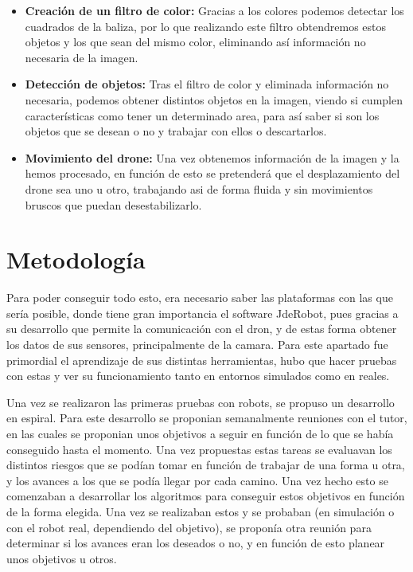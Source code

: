 \begin{itemize}
	\item \textbf{Creaci\'on de un filtro de color:} Gracias a los colores podemos detectar los cuadrados de la baliza, por lo que realizando este filtro obtendremos estos objetos y los que sean del mismo color, eliminando as\'i informaci\'on no necesaria de la imagen.
	
	\item \textbf{Detecci\'on de objetos: } Tras el filtro de color y eliminada informaci\'on no necesaria, podemos obtener distintos objetos en la imagen, viendo si cumplen caracter\'isticas como tener un determinado area, para as\'i saber si son los objetos que se desean o no y trabajar con ellos o descartarlos. 
	
	\item \textbf{Movimiento del drone: } Una vez obtenemos informaci\'on de la imagen y la hemos procesado, en funci\'on de esto se pretender\'a que el desplazamiento del drone sea uno u otro, trabajando asi de forma fluida y sin movimientos bruscos que puedan desestabilizarlo.   

\end{itemize}


\section{Metodolog\'ia}
\hspace{1 cm} Para poder conseguir todo esto, era necesario saber las plataformas con las que ser\'ia posible, donde tiene gran importancia el software JdeRobot, pues gracias a su desarrollo que permite la comunicaci\'on con el dron, y de estas forma obtener los datos de sus sensores, principalmente de la camara. Para este apartado fue primordial el aprendizaje de sus distintas herramientas, hubo que hacer pruebas con estas y ver su funcionamiento tanto en entornos simulados como en reales.

\hspace{1 cm}Una vez se realizaron las primeras pruebas con robots, se propuso un desarrollo en espiral. Para este desarrollo se proponian semanalmente reuniones con el tutor, en las cuales se proponian unos objetivos a seguir en funci\'on de lo que se hab\'ia conseguido hasta el momento. Una vez propuestas estas tareas se evaluavan los distintos riesgos que se pod\'ian tomar en funci\'on de trabajar de una forma u otra, y los avances a los que se pod\'ia llegar por cada camino. Una vez hecho esto se comenzaban a desarrollar los algoritmos para conseguir estos objetivos en funci\'on de la forma elegida. Una vez se realizaban estos y se probaban (en simulaci\'on o con el robot real, dependiendo del objetivo), se propon\'ia otra reuni\'on para determinar si los avances eran los deseados o no, y en funci\'on de esto planear unos objetivos u otros.  

